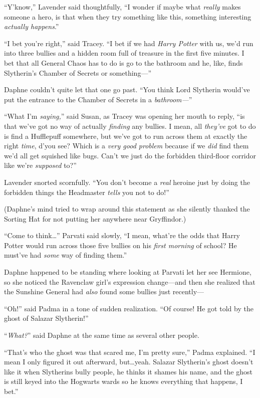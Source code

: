 “Y’know,” Lavender said thoughtfully, “I wonder if maybe what \emph{really}
makes someone a hero, is that when they try something like this, something
interesting \emph{actually happens}.”

“I bet you’re right,” said Tracey. “I bet if we had \emph{Harry Potter} with
us, we’d run into three bullies and a hidden room full of treasure in the first
five minutes. I bet that all General Chaos has to do is go to the bathroom and
he, like, finds Slytherin’s Chamber of Secrets or something—”

Daphne couldn’t quite let that one go past. “You think Lord Slytherin would’ve
put the entrance to the Chamber of Secrets in a \emph{bathroom—}”

“What I’m \emph{saying,}” said Susan, as Tracey was opening her mouth to reply,
“is that we’ve got no way of actually \emph{finding} any bullies. I mean, all
\emph{they’ve} got to do is find a Hufflepuff somewhere, but we’ve got to run
across them at exactly the right \emph{time}, d’you see? Which is a \emph{very
good problem} because if we \emph{did} find them we’d all get squished like
bugs. Can’t we just do the forbidden third-floor corridor like we’re
\emph{supposed} to?”

Lavender snorted scornfully. “You don’t become a \emph{real} heroine just by
doing the forbidden things the Headmaster \emph{tells} you not to do!”

(Daphne’s mind tried to wrap around this statement as she silently thanked the
Sorting Hat for not putting her anywhere near Gryffindor.)

“Come to think…” Parvati said slowly, “I mean, what’re the odds that
Harry Potter would run across those five bullies on his \emph{first morning} of
school? He must’ve had \emph{some} way of finding them.”

Daphne happened to be standing where looking at Parvati let her see Hermione,
so she noticed the Ravenclaw girl’s expression change—and then she realized
that the Sunshine General had \emph{also} found some bullies just recently—

“Oh!” said Padma in a tone of sudden realization. “Of course! He got told by
the ghost of Salazar Slytherin!”

“\emph{What?}” said Daphne at the same time as several other people.

“That’s who the ghost was that scared me, I’m pretty sure,” Padma explained. “I
mean I only figured it out afterward, but…yeah. Salazar Slytherin’s
ghost doesn’t like it when Slytherins bully people, he thinks it shames his
name, and the ghost is still keyed into the Hogwarts wards so he knows
everything that happens, I bet.”

